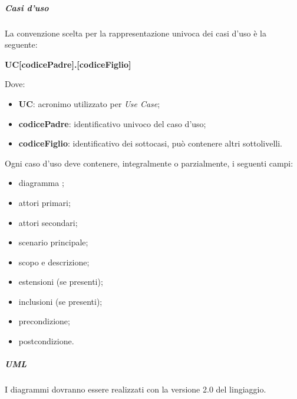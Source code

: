 				\subparagraph{Casi d'uso}
				La convenzione scelta per la rappresentazione univoca dei casi d'uso è la seguente:
				\begin{center}
					\textbf{UC[codicePadre].[codiceFiglio]}
				\end{center}					
				Dove:
				\begin{itemize}
					\item \textbf{UC}: acronimo utilizzato per \textit{Use Case};
					\item \textbf{codicePadre}: identificativo univoco del caso d'uso;
					\item \textbf{codiceFiglio}: identificativo dei sottocasi, può contenere altri sottolivelli.
				\end{itemize}
				Ogni caso d'uso deve contenere, integralmente o parzialmente, i seguenti campi:
				\begin{itemize}
					\item diagramma ;
					\item attori primari;
					\item attori secondari;
					\item scenario principale;
					\item scopo e descrizione;
					\item estensioni (se presenti);
					\item inclusioni (se presenti);
					\item precondizione;
					\item postcondizione.
				\end{itemize}
				\subparagraph{UML}
				I diagrammi  dovranno essere realizzati con la versione 2.0 del lingiaggio.
